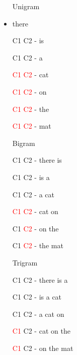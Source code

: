 \begin{multicols}{2}
\begin{itemize}
		\begin{itemize}
		\setlength\itemsep{.001cm}
			\item [Unigram]
			\item there 
			\item[C1 C2 -]		 is 
			\item[C1 C2 -]		 a 
			\item[\textcolor{red}{C1} \textcolor{red}{C2} -]		 cat 
			\item[\textcolor{red}{C1} \textcolor{red}{C2} -]		 on 
			\item[\textcolor{red}{C1} \textcolor{red}{C2} -]		 the 
			\item[\textcolor{red}{C1} \textcolor{red}{C2} -]		 mat
			\item [Bigram]
			\item[C1 C2 -]		 there is
			\item[C1 C2 -]		 is a
			\item[C1 C2 -]		 a cat
			\item[\textcolor{red}{C1} \textcolor{red}{C2} -]		 cat on 
			\item[C1 \textcolor{red}{C2} -]		 on the
			\item[C1 \textcolor{red}{C2} -]		 the mat
			\item [Trigram] 
			\item[C1 C2 -]	there is a
			\item[C1 C2 -]	is a cat
			\item[C1 C2 -]	a cat on
			\item[\textcolor{red}{C1} C2 -]	cat on the
			\item[\textcolor{red}{C1} C2 -]	on the mat
		\end{itemize}
\end{itemize}
\end{multicols}


